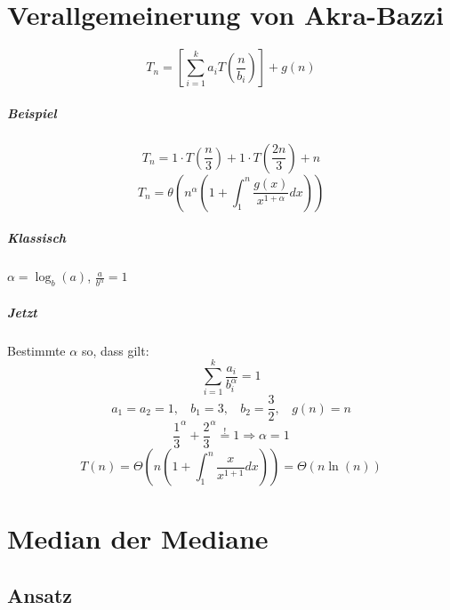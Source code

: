 

\chapter{Verallgemeinerung von Akra-Bazzi}
\label{ch:12}

\[T_n = \left[\sum_{i=1}^k a_i T(\frac{n}{b_i}) \right] + g(n) \]
\paragraph{Beispiel}
\[T_n = 1\cdot T\left(\frac{n}{3}\right)+1\cdot T\left(\frac{2n}{3}\right) + n \]
\[T_n = \theta\left(n^{\alpha}\left(1+\int_1^n\frac{g\left(x\right)}{x^{1+\alpha}} dx\right)\right)  \]


\paragraph{Klassisch} $\alpha = \log_b(a)$, $\frac{a}{b^{\alpha}} = 1$
\paragraph{Jetzt} Bestimmte $\alpha$ so, dass gilt:
\[\sum_{i=1}^k \frac{a_i}{b_i^{\alpha}} = 1 \]
\[a_1 = a_2 = 1, ~~~~ b_1 = 3, ~~~~ b_2 = \frac{3}{2}, ~~~~ g(n) = n \]
 \[\frac{1}{3}^{\alpha} + \frac{2}{3}^{\alpha} \overset{!}{=} 1 \Rightarrow \alpha = 1 \]
\[T(n) = \Theta \left(n \left(1+\int_1^n \frac{x}{x^{1+1}} dx\right) \right) = \Theta(n\ln(n)) \]


\chapter{Median der Mediane}
\section{Ansatz} %
